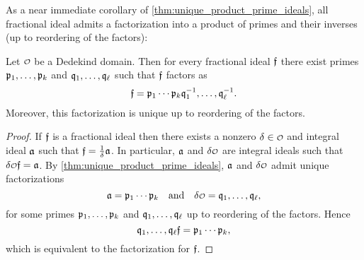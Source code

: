     As a near immediate corollary of \cref{thm:unique_product_prime_ideals}, all fractional ideal admits a factorization into a product of primes and their inverses (up to reordering of the factors):

    \begin{corollary}\label{cor:fractional_ideal_prime_factorization}
      Let $\smc{O}$ be a Dedekind domain. Then for every fractional ideal $\mathfrak{f}$ there exist primes $\mathfrak{p}_{1},\ldots,\mathfrak{p}_{k}$ and $\mathfrak{q}_{1},\ldots,\mathfrak{q}_{\ell}$ such that $\mathfrak{f}$ factors as
      \[
        \mathfrak{f} = \mathfrak{p}_{1} \cdots \mathfrak{p}_{k}\mathfrak{q}_{1}^{-1},\ldots,\mathfrak{q}_{\ell}^{-1}.
      \]
      Moreover, this factorization is unique up to reordering of the factors.
    \end{corollary}
    \begin{proof}
      If $\mathfrak{f}$ is a fractional ideal then there exists a nonzero $\d \in \smc{O}$ and integral ideal $\mathfrak{a}$ such that $\mathfrak{f} = \frac{1}{\delta}\mathfrak{a}$. In particular, $\mathfrak{a}$ and $\d\smc{O}$ are integral ideals such that $\d\smc{O}\mf{f} = \mf{a}$. By \cref{thm:unique_product_prime_ideals}, $\mathfrak{a}$ and $\d\smc{O}$ admit unique factorizations
      \[
        \mf{a} = \mf{p}_{1} \cdots \mf{p}_{k} \quad \text{and} \quad \d\smc{O} = \mf{q}_{1},\ldots,\mf{q}_{\ell},
      \]
      for some primes $\mathfrak{p}_{1},\ldots,\mathfrak{p}_{k}$ and $\mathfrak{q}_{1},\ldots,\mathfrak{q}_{\ell}$ up to reordering of the factors. Hence
      \[
        \mathfrak{q}_{1},\ldots,\mathfrak{q}_{\ell}\mathfrak{f} = \mathfrak{p}_{1} \cdots \mathfrak{p}_{k},
      \]
      which is equivalent to the factorization for $\mathfrak{f}$.
    \end{proof}

